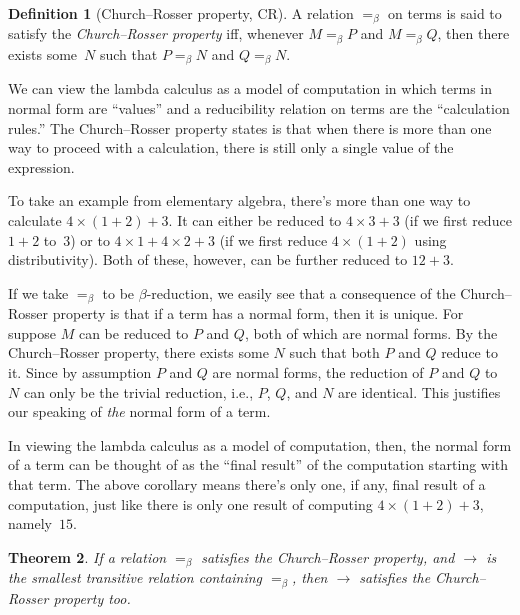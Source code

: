 \documentclass[10pt,a4paper]{article}
\theoremstyle{plain}
\newtheorem{thm}{Theorem}[section]
\theoremstyle{definition}
\newtheorem{defn}[thm]{Definition}
\theoremstyle{remark}
\newcommand*{\ollabel}[1]{\label{#1}}
\providecommand{\xredone}{\mathrel{=_\beta}}
\providecommand{\xred}{\mathrel{\rightarrow}}
\begin{document}
\begin{defn}[Church--Rosser property, CR] A relation $\xredone$ on
  terms is said to satisfy the \emph{Church--Rosser property} iff,
  whenever $M \xredone P$ and $M \xredone Q$, then there exists
  some~$N$ such that $P \xredone N$ and $Q \xredone N$.
\end{defn}

We can view the lambda calculus as a model of computation in which
terms in normal form are ``values'' and a reducibility relation on
terms are the ``calculation rules.'' The Church--Rosser property states
is that when there is more than one way to proceed with a calculation,
there is still only a single value of the expression.

To take an example from elementary algebra, there's more than one way
to calculate $4 \times (1+2) + 3$. It can either be reduced to $4
\times 3+3$ (if we first reduce $1+2$ to~$3$) or to $4 \times 1+4
\times 2+3$ (if we first reduce $4 \times (1+2)$ using
distributivity). Both of these, however, can be further reduced to
$12+3$.

If we take $\xredone$ to be $\beta$-reduction, we easily see that a
consequence of the Church--Rosser property is that if a term has a
normal form, then it is unique. For suppose $M$ can be reduced to $P$
and $Q$, both of which are normal forms. By the Church--Rosser property,
there exists some $N$ such that both $P$ and $Q$ reduce to it. Since
by assumption $P$ and $Q$ are normal forms, the reduction of $P$ and
$Q$ to $N$ can only be the trivial reduction, i.e., $P$, $Q$, and $N$
are identical. This justifies our speaking of \emph{the} normal form
of a term.

In viewing the lambda calculus as a model of computation, then, the
normal form of a term can be thought of as the ``final result'' of the
computation starting with that term. The above corollary means there's
only one, if any, final result of a computation, just like there is
only one result of computing $4 \times (1+2)+3$, namely~$15$.

\begin{thm} \ollabel{thm:str}
  If a relation $\xredone$ satisfies the Church--Rosser property, and $\xred$ is the
  smallest transitive relation containing $\xredone$, then $\xred$ satisfies
  the Church--Rosser property too.
\end{thm}
\end{document}
